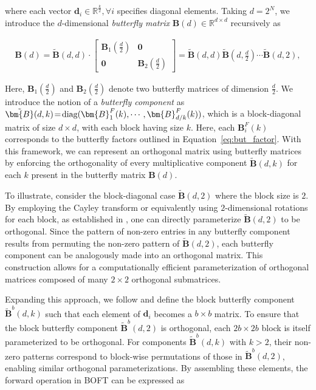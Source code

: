 where each vector $\bm{d}_i\in\mathbb{R}^{\frac{k}{2}},\forall i$ specifies diagonal elements. Taking $d=2^N$, we introduce the $d$-dimensional \emph{butterfly matrix} $\bm{B}(d)\in\mathbb{R}^{d\times d}$ recursively as

\begin{equation}
\begin{aligned}
    \!\!\bm{B}(d)=\tilde{\bm{B}}(d,d)\!\cdot\!\begin{bmatrix}
    \bm{B}_1(\frac{d}{2})\!\!\!\!\! & \bm{0} \\
    \bm{0}\!\!\!\!\! &\bm{B}_2(\frac{d}{2})
    \end{bmatrix}= \tilde{\bm{B}}(d,d)\tilde{\bm{B}}(d,\frac{d}{2})\cdots\tilde{\bm{B}}(d,2),
\end{aligned}
\end{equation}

Here, $\bm{B}_1(\frac{d}{2})$ and $\bm{B}_2(\frac{d}{2})$ denote two butterfly matrices of dimension $\frac{d}{2}$. We introduce the notion of a \emph{butterfly component} as $\thickmuskip=2mu \medmuskip=2mu \tilde{\bm{B}}(d,k)=\text{diag}(\bm{B}^F_1(k),\cdots,\bm{B}^F_{d/k}(k))$, which is a block-diagonal matrix of size $d\times d$, with each block having size $k$. Here, each $\bm{B}^F_i(k)$ corresponds to the butterfly factors outlined in Equation~\ref{eq:but_factor}. With this framework, we can represent an orthogonal matrix using butterfly matrices by enforcing the orthogonality of every multiplicative component $\tilde{\bm{B}}(d,k)$ for each $k$ present in the butterfly matrix $\bm{B}(d)$. 

To illustrate, consider the block-diagonal case $\tilde{\bm{B}}(d,2)$ where the block size is $2$. By employing the Cayley transform or equivalently using $2$-dimensional rotations for each block, as established in \cite{liu2021orthogonal,qiu2023controlling}, one can directly parameterize $\tilde{\bm{B}}(d,2)$ to be orthogonal. Since the pattern of non-zero entries in any butterfly component results from permuting the non-zero pattern of $\tilde{\bm{B}}(d,2)$, each butterfly component can be analogously made into an orthogonal matrix. This construction allows for a computationally efficient parameterization of orthogonal matrices composed of many $2\times 2$ orthogonal submatrices.

Expanding this approach, we follow \cite{chen2022pixelated} and define the block butterfly component $\tilde{\bm{B}}^b(d,k)$ such that each element of $\bm{d}_i$ becomes a $b\times b$ matrix. To ensure that the block butterfly component $\tilde{\bm{B}}^b(d,2)$ is orthogonal, each $2b\times 2b$ block is itself parameterized to be orthogonal. For components $\tilde{\bm{B}}^b(d,k)$ with $k>2$, their non-zero patterns correspond to block-wise permutations of those in $\tilde{\bm{B}}^b(d,2)$, enabling similar orthogonal parameterizations. By assembling these elements, the forward operation in BOFT can be expressed as

